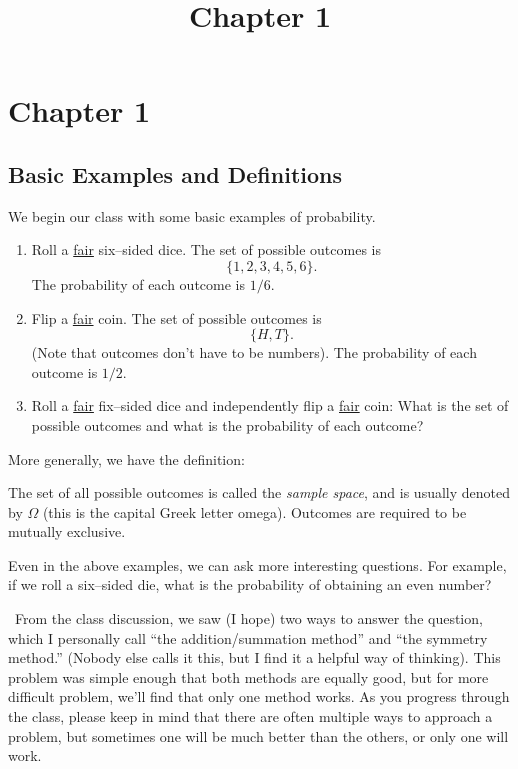 \documentclass{ximera}
\title{Chapter 1}
\begin{document}
\begin{abstract}
\end{abstract}
\maketitle
\section{Chapter 1}

\subsection{Basic Examples and Definitions}\label{Beg}
We begin our class with some basic examples of probability.

\begin{enumerate}
\item

Roll a \underline{fair} six--sided dice. The set of possible outcomes is
$$
\{1,2,3,4,5,6\}.
$$
The probability of each outcome is $1/6$.

\item
Flip a \underline{fair} coin. The set of possible outcomes is
$$
\{H,T\}.
$$
(Note that outcomes don't have to be numbers). The probability of each outcome is $1/2$.

\item
Roll a \underline{fair} fix--sided dice and independently flip a \underline{fair} coin: What is the set of possible outcomes and what is the probability of each outcome?

\end{enumerate}

More generally, we have the definition:

\begin{definition}
The set of all possible outcomes is called the \textit{sample space}, and is usually denoted by $\Omega$ (this is the capital Greek letter omega). Outcomes are required to be mutually exclusive. 
\end{definition}

Even in the above examples, we can ask more interesting questions. For example, if we roll a six--sided die, what is the probability of obtaining an even number?

\Lightning \Lightning \      From the class discussion, we saw (I hope) two ways to answer the question, which I personally call ``the addition/summation method'' and ``the symmetry method.'' (Nobody else calls it this, but I find it a helpful way of thinking). This problem was simple enough that both methods are equally good, but for more difficult problem, we'll find that only one method works. As you progress through the class, please keep in mind that there are often multiple ways to approach a problem, but sometimes one will be much better than the others, or only one will work.  \Lightning \Lightning
\end{document}
